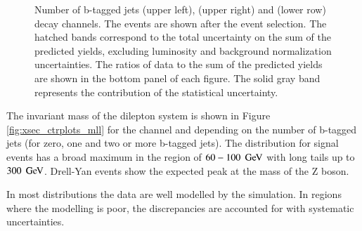 \begin{figure}[htbp!]
\begin{center}
    \caption{Number of b-tagged jets \emu (upper left), \mumu (upper right) and \ee (lower row) decay channels.
        The events are shown after the
        event selection.  The hatched
        bands correspond to the total uncertainty on the sum of the
        predicted yields, excluding luminosity and background
        normalization uncertainties. 
        The ratios of data to the sum of the predicted yields are
        shown in the bottom panel of each figure. The solid gray band
        represents the contribution of the statistical uncertainty.}  
       \label{fig:xsec_bjets_ctrplots}
  \end{center}
\end{figure}


The invariant mass of the dilepton system is shown in Figure \ref{fig:xsec_ctrplots_mll} for the \emu channel and depending on the number of b-tagged jets (for zero, one and two or more b-tagged jets).
The distribution for signal events has a broad maximum in the region of $60-100 \; \,\text{Ge\hspace{-.08em}V}$ with long tails up to $300 \; \,\text{Ge\hspace{-.08em}V}$.
Drell-Yan events show the expected peak at the mass of the Z boson.


In most distributions the data are well modelled by the simulation. In regions where the modelling is poor, the discrepancies are accounted for with systematic uncertainties.

